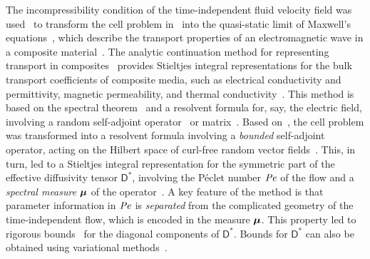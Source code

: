 \documentclass[leqno,onefignum,onetabnum]{siamltex1213}
\newcommand{\Dm}{\mathsf{D}}
\newcommand\Pen{\mbox{\textit{Pe}}}  %
\newcommand\bmu{\mbox{\boldmath${\mu}$}}
\begin{document}
The incompressibility condition of the time-independent fluid velocity
field was used~\cite{Avellaneda:PRL-753,Avellaneda:CMP-339} to
transform the cell problem in~\cite{McLaughlin:SIAM_JAM:780} into the
quasi-static limit of Maxwell's
equations~\cite{Jackson-1999,Golden:CMP-473}, which describe the
transport properties of an electromagnetic wave in a composite
material~\cite{MILTON:2002:TC}. The analytic continuation method for
representing transport in composites~\cite{Golden:CMP-473} provides
Stieltjes integral representations for the bulk transport coefficients
of composite media, such as electrical conductivity and permittivity,
magnetic permeability, and thermal
conductivity~\cite{MILTON:2002:TC}. This method is based on the
spectral theorem~\cite{Stone:64,Reed-1980} and a resolvent formula
for, say, the electric field, involving a random self-adjoint
operator~\cite{Golden:CMP-473,Murphy:JMP:063506} or
matrix~\cite{Murphy:2015:CMS:13:4:825}. Based on~\cite{Golden:CMP-473}, 
the cell problem was transformed into a resolvent formula involving a
\emph{bounded} self-adjoint operator, acting on the Hilbert
space of curl-free random vector
fields~\cite{Avellaneda:PRL-753,Avellaneda:CMP-339}. This, in turn,     
led to a Stieltjes integral representation for the symmetric part of
the effective diffusivity tensor $\Dm^*$, involving the P{\'e}clet
number $\Pen$ of the flow and a \emph{spectral measure} $\bmu$ of the
operator~\cite{Avellaneda:PRL-753,Avellaneda:CMP-339}. A key feature
of the method is that parameter information in $\Pen$ is 
\emph{separated} from the complicated geometry of the time-independent
flow, which is encoded in the measure $\bmu$. This property led to
rigorous bounds~\cite{Avellaneda:CMP-339} for the diagonal components
of $\Dm^*$. Bounds for $\Dm^*$ can also be obtained using variational 
methods~\cite{Avellaneda:CMP-339,Fannjiang:1994:SIAM_JAM:333,Novikov:2005:CPAM:867,Fannjiang:1997:1033}.  
\end{document}
